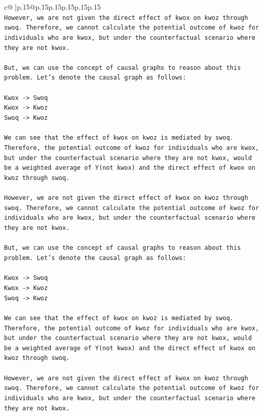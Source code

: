 \documentclass{article}
\begin{document}
{\begin{supertabular}{c@{$\;$}|p{.15\linewidth}@{}p{.15\linewidth}p{.15\linewidth}p{.15\linewidth}p{.15\linewidth}p{.15\linewidth}}
{{{\\ 
\texttt{However, we are not given the direct effect of kwox on kwoz through swoq. Therefore, we cannot calculate the potential outcome of kwoz for individuals who are kwox, but under the counterfactual scenario where they are not kwox.} \\
\\ 
\texttt{But, we can use the concept of causal graphs to reason about this problem. Let's denote the causal graph as follows:} \\
\\ 
\texttt{Kwox {-}> Swoq} \\
\texttt{Kwox {-}> Kwoz} \\
\texttt{Swoq {-}> Kwoz} \\
\\ 
\texttt{We can see that the effect of kwox on kwoz is mediated by swoq. Therefore, the potential outcome of kwoz for individuals who are kwox, but under the counterfactual scenario where they are not kwox, would be a weighted average of Y(not kwox) and the direct effect of kwox on kwoz through swoq.} \\
\\ 
\texttt{However, we are not given the direct effect of kwox on kwoz through swoq. Therefore, we cannot calculate the potential outcome of kwoz for individuals who are kwox, but under the counterfactual scenario where they are not kwox.} \\
\\ 
\texttt{But, we can use the concept of causal graphs to reason about this problem. Let's denote the causal graph as follows:} \\
\\ 
\texttt{Kwox {-}> Swoq} \\
\texttt{Kwox {-}> Kwoz} \\
\texttt{Swoq {-}> Kwoz} \\
\\ 
\texttt{We can see that the effect of kwox on kwoz is mediated by swoq. Therefore, the potential outcome of kwoz for individuals who are kwox, but under the counterfactual scenario where they are not kwox, would be a weighted average of Y(not kwox) and the direct effect of kwox on kwoz through swoq.} \\
\\ 
\texttt{However, we are not given the direct effect of kwox on kwoz through swoq. Therefore, we cannot calculate the potential outcome of kwoz for individuals who are kwox, but under the counterfactual scenario where they are not kwox.} \\
}}}
\end{supertabular}}
\end{document}
